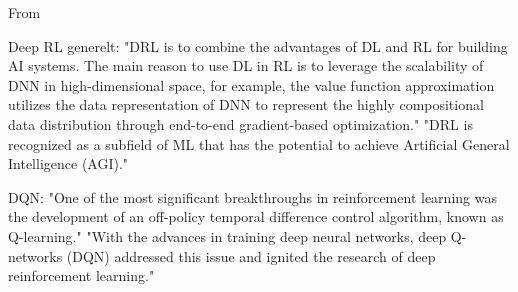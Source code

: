 From \parencite{zhang2020taxonomy_reinforcement_learning_algorithms}

Deep RL generelt:
"DRL is to combine the advantages of DL and RL for building AI systems. The main reason to use DL in RL is to leverage the scalability of DNN in high-dimensional space, for example, the value function approximation utilizes the data representation of DNN to represent the highly compositional data distribution through end-to-end gradient-based optimization."
"DRL is recognized as a subfield of ML that has the potential to achieve Artificial General Intelligence (AGI)."

DQN:
"One of the most significant breakthroughs in reinforcement learning was the development of an off-policy temporal difference control algorithm, known as Q-learning."
"With the advances in training deep neural networks, deep Q-networks (DQN) addressed this issue and ignited the research of deep reinforcement learning."
